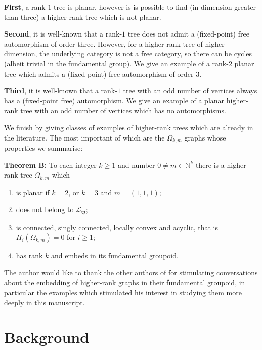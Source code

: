 \documentclass[12pt]{amsart}
\theoremstyle{definition}
\theoremstyle{remark}
\numberwithin{equation}{section}
\newcommand{\NN}{\mathbb{N}}
\begin{document}
\textbf{First}, a rank-$1$ tree is planar, however is is possible to find (in dimension greater than three) a higher rank tree which is not planar. 

\textbf{Second}, it is well-known that a rank-$1$ tree does not admit a (fixed-point) free automorphism of order three. However, for a higher-rank 
tree of higher dimension, the underlying category is not a free category, so there can be cycles (albeit trivial in the fundamental group). We give an example of a rank-$2$ planar tree which admits a (fixed-point) free automorphism of order $3$.

\textbf{Third}, it is well-known that a rank-$1$ tree with an odd number of vertices always has a (fixed-point free) automorphism. We give an example of a planar higher-rank tree with an odd number of vertices which has no automorphisms.

We finish by giving classes of examples of higher-rank trees which are already in the literature.
The most important of which are the $\Omega_{k,m}$ graphs whose properties we summarise:
\par\noindent\textbf{Theorem B:} To each integer $k \ge 1$ and number $0 \neq m \in \NN^k$ there is a higher rank tree  $\Omega_{k,m}$ which
\begin{enumerate}[leftmargin=0.5cm]
\item[$\bullet$] is planar if $k=2$, or $k=3$ and $m=(1,1,1)$;
\item[$\bullet$] does not belong to $\mathcal{L}_{\mathfrak{P}}$;
\item[$\bullet$] is connected, singly connected, locally convex and acyclic, that is $H_i ( \Omega_{k,m} ) =0$ for $i \ge 1$;
\item[$\bullet$] has rank $k$ and embeds in its fundamental groupoid.
\end{enumerate}

 

The author would like to thank the other authors of \cite{bkps} for stimulating conversations about the embedding of higher-rank graphs in their fundamental groupoid, in particular the examples which stimulated his interest in studying them more deeply in this manuscript.

\section{Background} \label{sec:one}
\end{document}
